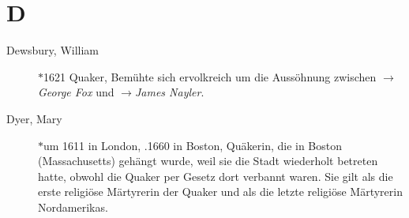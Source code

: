 \section*{D}

\articlesize

\begin{description}

 \item[Dewsbury, William] $\ast$1621  Quaker, Bemühte sich ervolkreich um
 die Aussöhnung zwischen $\to$\textit{George Fox} und $\to$\textit{James Nayler}.

 \item[Dyer, Mary] $\ast$um 1611 in London, .1660 in Boston, Quäkerin, die in
 Boston (Massachusetts) gehängt wurde, weil sie die Stadt wiederholt betreten hatte,
 obwohl die Quaker per Gesetz dort verbannt waren. Sie gilt als die erste religiöse
 Märtyrerin der Quaker und als die letzte religiöse Märtyrerin Nordamerikas.

 \end{description}

\normalsize